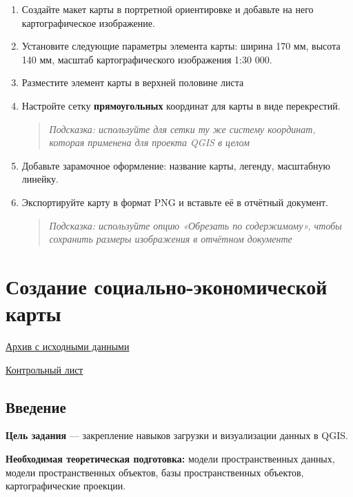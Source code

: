\documentclass[
  12pt,
]{book}
\begin{document}
\begin{enumerate}
\def\labelenumi{\arabic{enumi}.}
\setcounter{enumi}{6}
\item
  Создайте макет карты в портретной ориентировке и добавьте на него картографическое изображение.
\item
  Установите следующие параметры элемента карты: ширина 170 мм, высота 140 мм, масштаб картографического изображения 1:30 000.
\item
  Разместите элемент карты в верхней половине листа
\item
  Настройте сетку \textbf{прямоугольных} координат для карты в виде перекрестий.

  \begin{quote}
  \emph{Подсказка: используйте для сетки ту же систему координат, которая применена для проекта QGIS в целом}
  \end{quote}
\item
  Добавьте зарамочное оформление: название карты, легенду, масштабную линейку.
\item
  Экспортируйте карту в формат PNG и вставьте её в отчётный документ.

  \begin{quote}
  \emph{Подсказка: используйте опцию «Обрезать по содержимому», чтобы сохранить размеры изображения в отчётном документе}
  \end{quote}
\end{enumerate}

\hypertarget{map-design-population}{%
\chapter{Создание социально-экономической карты}\label{map-design-population}}

\href{https://github.com/aentin/qgis-course/raw/master/files/Ex04.zip}{Архив с исходными данными}

\href{https://github.com/aentin/qgis-course/raw/master/files/Ex04_\%D0\%BE\%D1\%82\%D1\%87\%D1\%91\%D1\%82.docx}{Контрольный лист}

\hypertarget{map-design-population-intro}{%
\section{Введение}\label{map-design-population-intro}}

\textbf{Цель задания} --- закрепление навыков загрузки и визуализации данных в QGIS.

\textbf{Необходимая теоретическая подготовка:} модели пространственных данных, модели пространственных объектов, базы пространственных объектов, картографические проекции.
\end{document}
